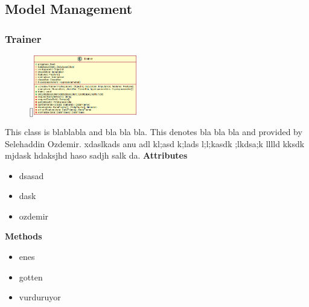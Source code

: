 \subsection{Model Management}

\subsubsection{Trainer}
\begin{figure}
    \raisebox{0pt}[\dimexpr{}\baselineskip\relax]{\includegraphics[width=4.5cm]{classes/model-management/1.png}}
\end{figure} 
\par
This class is blablabla and bla bla bla. This denotes bla bla bla and provided by Selehaddin Ozdemir. xdaslkads anu adl kl;asd k;lads l;l;kasdk ;lkdsa;k lllld kksdk mjdask hdaksjhd haso sadjh salk da.
\newline
\newline
\textbf{Attributes}
\begin{itemize}
    \item dsasad
    \item dask
    \item ozdemir
\end{itemize}
\textbf{Methods}
\begin{itemize}
    \item enes
    \item gotten
    \item vurduruyor
\end{itemize}

